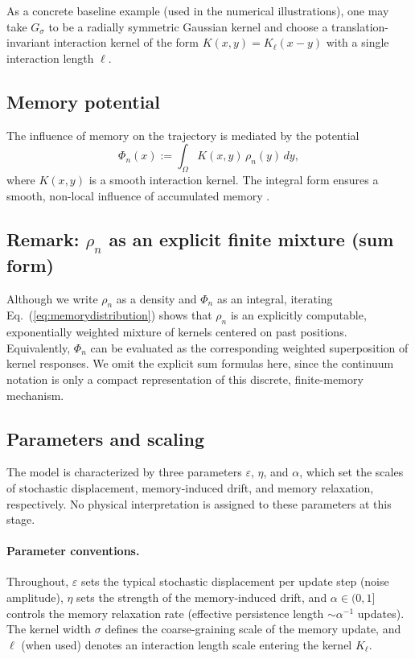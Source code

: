 \documentclass[reprint,amsmath,amssymb,aps,prd,nofootinbib,floatfix]{revtex4-2}
\begin{document}
As a concrete baseline example (used in the numerical illustrations), one may take $G_\sigma$ to be a radially symmetric Gaussian kernel and choose a translation-invariant interaction kernel of the form $K(x,y)=K_\ell(x-y)$ with a single interaction length $\ell$.

\subsection{Memory potential}

The influence of memory on the trajectory is mediated by the potential
\begin{equation}\label{eq:memorypotential}
\Phi_n(x) := \int_\Omega K(x,y)\,\rho_n(y)\,dy,
\end{equation}
where $K(x,y)$ is a smooth interaction kernel. 
The integral form ensures a smooth, non-local influence of accumulated memory \cite{Mori1965,Zwanzig2001}.

\subsection{Remark: $\rho_n$ as an explicit finite mixture (sum form)}

Although we write $\rho_n$ as a density and $\Phi_n$ as an integral, iterating Eq.~(\ref{eq:memorydistribution}) shows that $\rho_n$ is an explicitly computable, exponentially weighted mixture of kernels centered on past positions.
Equivalently, $\Phi_n$ can be evaluated as the corresponding weighted superposition of kernel responses.
We omit the explicit sum formulas here, since the continuum notation is only a compact representation of this discrete, finite-memory mechanism.

\subsection{Parameters and scaling}
The model is characterized by three parameters $\varepsilon$, $\eta$, and $\alpha$, which set the scales of stochastic displacement, memory-induced drift, and memory relaxation, respectively. No physical interpretation is assigned to these parameters at this stage.

\paragraph{Parameter conventions.}
Throughout, $\varepsilon$ sets the typical stochastic displacement per update step (noise amplitude), $\eta$ sets the strength of the memory-induced drift, and $\alpha\in(0,1]$ controls the memory relaxation rate (effective persistence length $\sim\alpha^{-1}$ updates). The kernel width $\sigma$ defines the coarse-graining scale of the memory update, and $\ell$ (when used) denotes an interaction length scale entering the kernel $K_\ell$.
\end{document}

